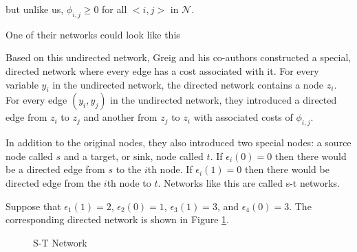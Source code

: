 \noindent
but unlike us, $\phi_{i,j} \geq 0$ for all $<i, j>$ in $\mathcal{N}$. 

One of their networks could look like this

\begin{figure}[!h]
\centering


\end{figure}

Based on this undirected network, Greig and his co-authors constructed
a special, directed network where every edge has a cost associated
with it. For every variable $y_i$ in the undirected network, the
directed network contains a node $z_i$.  For every edge $(y_i, y_j)$ in the
undirected network, they introduced a directed edge from $z_i$ to $z_j$ and
another from $z_j$ to $z_i$ with associated costs of $\phi_{i,j}$.

In addition to the original nodes, they also introduced two special
nodes: a source node called $s$ and a target, or sink, node called
$t$. If $\epsilon_i(0) = 0$ then there would be a directed edge from
$s$ to the $i$th node. If $\epsilon_i(1) = 0$ then there would be
directed edge from the $i$th node to $t$. Networks like this are
called s-t networks.

Suppose that $\epsilon_1(1)=2$, $\epsilon_2(0)=1$, $\epsilon_3(1)=3$,
and $\epsilon_4(0)=3$. The corresponding directed network is shown in
Figure \ref{fig:directed}. 

\begin{figure}[!h]
\centering

\caption{S-T Network}
\label{fig:directed}
\end{figure}

